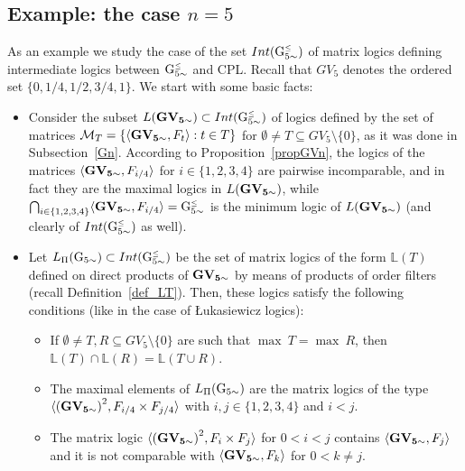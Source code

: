 \documentclass{article}
\theoremstyle{definition}
\newcommand{\Gcsimleq}{\mathrm{G}\mystrut^{\text{\tiny $\leq$}}_{5\sim}}
\newcommand\mystrut{\rule{0pt}{7pt}}
\begin{document}
  \subsection{Example: the case $n = 5$} \label{n5}
 As an example we study the case of  the set $Int(\Gcsimleq)$ of matrix logics defining intermediate logics between $\Gcsimleq$ and CPL. Recall that $GV_{5}$ denotes the ordered set $\{0,1/4,1/2,3/4,1\}$. We start with some basic facts:

 \begin{itemize}
\item Consider the subset $L({\bf GV_{5\sim}}) \subset Int(\Gcsimleq)$ of logics defined by the set of matrices ${\cal M}_T = \{\langle {\bf GV_{5\sim}}, F_{t}\rangle : t \in T\}$ for $\emptyset \neq T \subseteq GV_5 \setminus \{0\}$, as it was done in Subsection~\ref{Gn}.
According to Proposition~\ref{propGVn}, the logics of the matrices $\langle {\bf GV_{5\sim}}, F_{i/4}\rangle$ for $i \in \{1, 2, 3, 4\}$ are pairwise incomparable, and in fact they are the maximal logics in $L({\bf GV_{5\sim}})$, while $\bigcap_{ i \in \{1, 2, 3, 4\}} \langle {\bf GV_{5\sim}}, F_{i/4}\rangle = \Gcsimleq$ is the minimum logic of $L({\bf GV_{5\sim}})$ (and clearly of $Int(\Gcsimleq)$ as well).

\item Let $L_\Pi({\rm G}_{5 \sim}) \subset Int(\Gcsimleq)$
be the set  of  matrix logics of the form $\mathbb{L}(T)$ defined on direct products of {$\bf GV_{5 \sim}$} by means of products of order filters (recall Definition~\ref{def_LT}). Then, these logics satisfy the following conditions (like in the case of {\L}ukasiewicz logics):

 \begin{itemize}
\item If $\emptyset\neq T, R \subseteq GV_5\setminus\{0\}$ are such that $\max \ T = \max \ R$, then $\mathbb{L}(T) \cap \mathbb{L}(R) = \mathbb{L}(T \cup R)$.

\item The maximal elements of
$L_\Pi({\rm G}_{5 \sim})$ are the matrix logics of the type $\langle {\bf (GV_{5\sim})}^2, F_{i/4} \times F_{j/4} \rangle$ with $i,j \in \{1,2,3,4\}$ and $i < j$.

\item The matrix logic $\langle {\bf (GV_{5 \sim})}^2, F_i \times F_j\rangle$ for $0<i < j$ contains $\langle {\bf GV_{5 \sim}}, F_j\rangle$  and it is not comparable with $\langle {\bf GV_{5 \sim}}, F_k\rangle$ for $0<k \neq j$.


\end{itemize}
\end{itemize}
\end{document}
